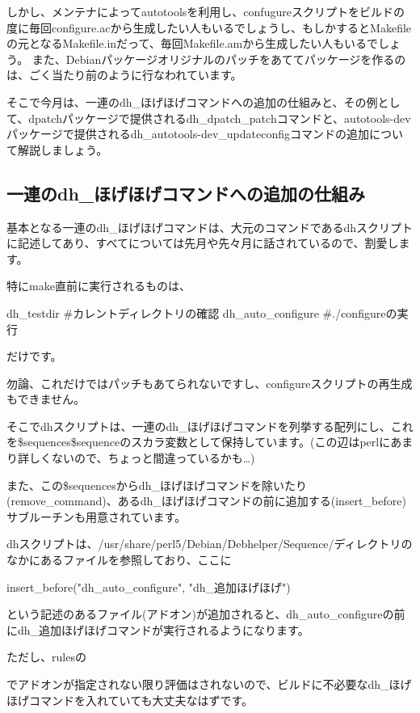 \documentclass[mingoth,a4paper]{jsarticle}
\begin{document}
しかし、メンテナによってautotoolsを利用し、confugureスクリプトをビルドの度に毎回configure.acから生成したい人もいるでしょうし、もしかするとMakefileの元となるMakefile.inだって、毎回Makefile.amから生成したい人もいるでしょう。
また、Debianパッケージオリジナルのパッチをあててパッケージを作るのは、ごく当たり前のように行なわれています。

そこで今月は、一連のdh\_ほげほげコマンドへの追加の仕組みと、その例として、dpatchパッケージで提供されるdh\_dpatch\_patchコマンドと、autotools-devパッケージで提供されるdh\_autotools-dev\_updateconfigコマンドの追加について解説しましょう。

\subsection{一連のdh\_ほげほげコマンドへの追加の仕組み}

基本となる一連のdh\_ほげほげコマンドは、大元のコマンドであるdhスクリプトに記述してあり、すべてについては先月や先々月に話されているので、割愛します。

特にmake直前に実行されるものは、
\begin{commandline}
dh_testdir  #カレントディレクトリの確認
dh_auto_configure  #./configureの実行
\end{commandline}
だけです。

勿論、これだけではパッチもあてられないですし、configureスクリプトの再生成もできません。

そこでdhスクリプトは、一連のdh\_ほげほげコマンドを列挙する配列にし、これを\$sequences{\$sequence}のスカラ変数として保持しています。(この辺はperlにあまり詳しくないので、ちょっと間違っているかも…)

また、この\$sequencesからdh\_ほげほげコマンドを除いたり(remove\_command)、あるdh\_ほげほげコマンドの前に追加する(insert\_before)サブルーチンも用意されています。

dhスクリプトは、/usr/share/perl5/Debian/Debhelper/Sequence/ディレクトリのなかにあるファイルを参照しており、ここに
\begin{commandline}
insert_before("dh_auto_configure", "dh_追加ほげほげ")
\end{commandline}
という記述のあるファイル(アドオン)が追加されると、dh\_auto\_configureの前にdh\_追加ほげほげコマンドが実行されるようになります。

ただし、rulesの
でアドオンが指定されない限り評価はされないので、ビルドに不必要なdh\_ほげほげコマンドを入れていても大丈夫なはずです。
\end{document}
